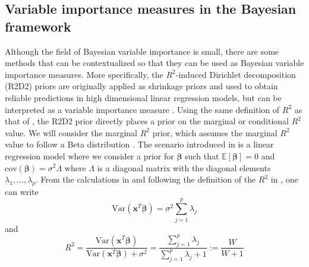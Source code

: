 \subsection{Variable importance measures in the Bayesian framework}
\label{sec:R2D2}
Although the field of Bayesian variable importance is small, there are some methods that can be contextualized so that they can be used as Bayesian variable importance measures.
More specifically, the $R^2$-induced Dirichlet decomposition (R2D2) priors are originally applied as shrinkage priors and used to obtain reliable predictions in high dimensional linear regression models, but can be interpreted as a variable importance measure \citep{zhang2020bayesian}. Using the same definition of $R^2$ as that of \citet{gelman2017rsquared}, the R2D2 prior directly places a prior on the marginal or conditional $R^2$ value. We will consider the marginal $R^2$ prior, which assumes the marginal $R^2$ value to follow a Beta distribution \citep{zhang2020bayesian}. The scenario introduced in \citet{zhang2020bayesian} is a linear regression model where we consider a prior for $\boldsymbol{\beta}$ such that $\mathbb{E}[\boldsymbol{\beta}]=0$ and $\text{cov}(\boldsymbol{\beta})=\sigma^2\Lambda$ where $\Lambda$ is a diagonal matrix with the diagonal elements $\lambda_1, ..., \lambda_p$. From the calculations in \citet{zhang2020bayesian} and following the definition of the $R^2$ in \citet{gelman2017rsquared}, one can write
\begin{equation}
    \text{Var}(\mathbf{x}^T\boldsymbol{\beta}) = \sigma^2\sum_{j=1}^{p}\lambda_j
\end{equation}
and 
\begin{equation}
    R^2 = \frac{\text{Var}(\mathbf{x}^T\boldsymbol{\beta})}{\text{Var}(\mathbf{x}^T\boldsymbol{\beta}) + \sigma^2} = \frac{\sum_{j=1}^{p}\lambda_j}{\sum_{j=1}^{p}\lambda_j + 1} := \frac{W}{W +1}
\end{equation}

